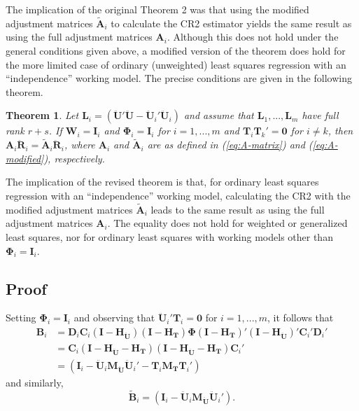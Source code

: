 \documentclass[12pt]{article}
\newtheorem*{thm}{Theorem}
\begin{document}
The implication of the original Theorem 2 was that using the modified
adjustment matrices \(\tilde{\mathbf{A}}_i\) to calculate the CR2
estimator yields the same result as using the full adjustment matrices
\(\mathbf{A}_i\). Although this does not hold under the general
conditions given above, a modified version of the theorem does hold for
the more limited case of ordinary (unweighted) least squares regression
with an ``independence'' working model. The precise conditions are given
in the following theorem.

\begin{thm}
\label{thm:absorb}
Let $\mathbf{L}_i = \left(\mathbf{\ddot{U}}'\mathbf{\ddot{U}} - \mathbf{\ddot{U}}_i'\mathbf{\ddot{U}}_i\right)$ and assume that $\mathbf{L}_1,...,\mathbf{L}_m$ have full rank $r + s$. If $\mathbf{W}_i = \mathbf{I}_i$ and $\boldsymbol\Phi_i = \mathbf{I}_i$ for $i = 1,...,m$ and $\mathbf{T}_i \mathbf{T}_k' = \mathbf{0}$ for $i \neq k$, then $\mathbf{A}_i \mathbf{\ddot{R}}_i = \mathbf{\tilde{A}}_i \mathbf{\ddot{R}}_i$, where $\mathbf{A}_i$ and $\tilde{\mathbf{A}}_i$ are as defined in (\ref{eq:A-matrix}) and (\ref{eq:A-modified}), respectively.
\end{thm}

The implication of the revised theorem is that, for ordinary least
squares regression with an ``independence'' working model, calculating
the CR2 with the modified adjustment matrices \(\tilde{\mathbf{A}}_i\)
leads to the same result as using the full adjustment matrices
\(\mathbf{A}_i\). The equality does not hold for weighted or generalized
least squares, nor for ordinary least squares with working models other
than \(\boldsymbol\Phi_i = \mathbf{I}_i\).

\hypertarget{proof}{%
\subsection{Proof}\label{proof}}

Setting \(\boldsymbol\Phi_i = \mathbf{I}_i\) and observing that
\(\mathbf{\ddot{U}}_i'\mathbf{T}_i = \mathbf{0}\) for \(i = 1,...,m\),
it follows that \begin{align}
\mathbf{B}_i &= \mathbf{D}_i \mathbf{C}_i \left(\mathbf{I} - \mathbf{H_{\ddot{U}}}\right) \left(\mathbf{I} - \mathbf{H_T}\right) \boldsymbol\Phi \left(\mathbf{I} - \mathbf{H_T}\right)' \left(\mathbf{I} - \mathbf{H_{\ddot{U}}}\right)' \mathbf{C}_i' \mathbf{D}_i' \nonumber \\ 
&= \mathbf{C}_i \left(\mathbf{I} - \mathbf{H_{\ddot{U}}} - \mathbf{H_T}\right) \left(\mathbf{I} - \mathbf{H_{\ddot{U}}} - \mathbf{H_T}\right) \mathbf{C}_i' \nonumber\\ 
\label{eq:B_i}
&= \left(\mathbf{I}_i - \mathbf{\ddot{U}}_i \mathbf{M_{\ddot{U}}}\mathbf{\ddot{U}}_i' - \mathbf{T}_i \mathbf{M_T}\mathbf{T}_i'\right)
\end{align} and similarly, \begin{equation}
\label{eq:Btilde_i}
\tilde{\mathbf{B}}_i = \left(\mathbf{I}_i - \mathbf{\ddot{U}}_i \mathbf{M_{\ddot{U}}}\mathbf{\ddot{U}}_i'\right).
\end{equation}
\end{document}

